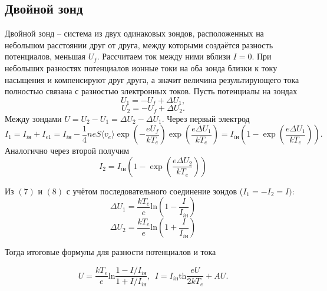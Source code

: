 \documentclass[a4paper, 10pt]{article}
\begin{document}
        \subsection*{Двойной зонд}
        Двойной зонд -- система из двух одинаковых зондов, расположенных на небольшом расстоянии друг от друга, между которыми создаётся разность потенциалов, меньшая $U_f$. Рассчитаем ток между ними вблизи $I=0$. При небольших разностях потенциалов ионные токи на оба зонда близки к току насыщения и компенсируют друг друга, а значит величина результирующего тока полностью связана с разностью электронных токов. Пусть потенциалы на зондах
        $$
        U_1 = -U_f + \Delta U_1,
        $$
        $$
        U_2 = -U_f + \Delta U_2.
        $$
        Между зондами $U = U_2 - U_1 = \Delta U_2 - \Delta U_1$.
        Через первый электрод
        \begin{equation}
                I_1 = I_{i\text{н}} + I_{e1} = I_{i\text{н}} - \dfrac{1}{4}neS\langle v_e\rangle \exp\left(-\dfrac{eU_f}{kT_e}\right)\exp\left(\dfrac{e\Delta U_1}{kT_e}\right)=I_{i\text{н}}\left(1 - \exp\left( \dfrac{e\Delta U_1}{kT_e} \right)\right).
        \end{equation}
        Аналогично через второй получим
        \begin{equation}
                I_2 = I_{i\text{н}}\left(1 - \exp\left( \dfrac{e\Delta U_2}{kT_e} \right)\right)
        \end{equation}

        Из $(7)$ и $(8)$ с учётом последовательного соединение зондов ($I_1 = -I_2 = I)$:
        $$
        \Delta U_1= \dfrac{kT_e}{e}\text{ln}\left(1 - \dfrac{I}{I_{i\text{н}}}\right)
        $$
        $$
        \Delta U_2= \dfrac{kT_e}{e}\text{ln}\left(1 + \dfrac{I}{I_{i\text{н}}}\right)
        $$

        Тогда итоговые формулы для разности потенциалов и тока

        \begin{equation}
                U = \dfrac{kT_e}{e}\text{ln}\dfrac{1 - I/I_{i\text{н}}}{1 + I/I_{i\text{н}}}, \ \
                I = I_{i\text{н}} \text{th}\dfrac{eU}{2kT_e} + AU.
                \label{tok}
        \end{equation}
\end{document}
